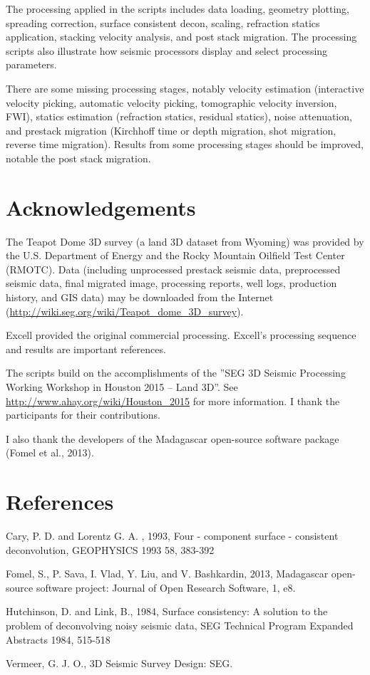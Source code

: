 The processing applied in the scripts includes data loading, geometry plotting, spreading correction, surface consistent decon, scaling, refraction statics application, stacking velocity analysis, and post stack migration.  The processing scripts also illustrate how seismic processors display and select processing parameters. 

There are some missing processing stages, notably velocity estimation (interactive velocity picking, automatic velocity picking, tomographic velocity inversion, FWI), statics estimation (refraction statics, residual statics), noise attenuation, and prestack migration (Kirchhoff time or depth migration, shot migration, reverse time migration).  Results from some processing stages should be improved, notable the post stack migration.

\section{Acknowledgements} 

The Teapot Dome 3D survey (a land 3D dataset from Wyoming) was provided by the U.S. Department of Energy and the Rocky Mountain Oilfield Test Center (RMOTC).  Data (including unprocessed prestack seismic data, preprocessed seismic data, final migrated image, processing reports, well logs, production history, and GIS data) may be downloaded from the Internet (\url{http://wiki.seg.org/wiki/Teapot_dome_3D_survey}).

Excell provided the original commercial processing.  Excell's processing sequence and results are important references.

The scripts build on the accomplishments of the ''SEG 3D Seismic Processing Working Workshop in Houston 2015 – Land 3D''.  See 
\url{http://www.ahay.org/wiki/Houston_2015} for more information.  I thank the participants for their contributions.

I also thank the developers of the Madagascar open-source software package (Fomel et al., 2013).

\section{References}

Cary, P. D. and Lorentz G. A. , 1993, Four - component surface - consistent deconvolution, GEOPHYSICS 1993 58, 383-392 

Fomel, S., P. Sava, I. Vlad, Y. Liu, and V. Bashkardin, 2013, Madagascar open-source software project: Journal of Open Research Software, 1, e8. 

Hutchinson, D. and Link, B., 1984, Surface consistency: A solution to the problem of deconvolving noisy seismic data,  SEG Technical Program Expanded Abstracts 1984, 515-518 

Vermeer, G. J. O., 3D Seismic Survey Design: SEG.
